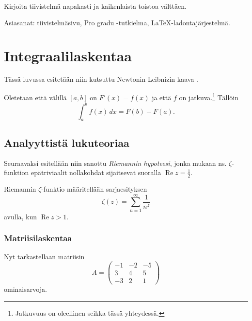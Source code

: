 \vspace{4mm}\noindent Kirjoita tiivistelmä napakasti ja kaikenlaista toistoa välttäen.

\vspace{4mm}\noindent Asiasanat: tiivistelmäsivu, Pro gradu -tutkielma, \LaTeX-ladontajärjestelmä.




\cleardoublepage

\tableofcontents

\cleardoublepage

\pagestyle{plain} 

\section{Integraalilaskentaa}

Tässä luvussa esitetään niin kutsuttu Newtonin-Leibnizin kaava \cite{NewtLeib}.

\begin{theorem} Oletetaan että välillä $[a,b]$ on $F'(x)=f(x)$ ja että $f$ on jatkuva.\footnote{Jatkuvuus on oleellinen seikka tässä yhteydessä.} Tällöin
\[
\int_a^bf(x)\,dx=F(b)-F(a).
\]
\end{theorem}

\subsection{Analyyttistä lukuteoriaa}

Seuraavaksi esitellään niin sanottu {\em Riemannin hypoteesi}, jonka mukaan ns. $\zeta$-funktion epätriviaalit nollakohdat sijaitsevat suoralla $\operatorname{Re}z=\frac12$.
\begin{definition} Riemannin $\zeta$-funktio määritellään sarjaesityksen \cite{Riemann}
\[
\zeta(z)=\sum_{n=1}^{\infty}\frac{1}{n^z}
\]
avulla, kun $\operatorname{Re}z>1$.
\end{definition}

\subsubsection{Matriisilaskentaa}

Nyt tarkastellaan matriisin
\[
A=\left(\begin{array}{rrr} -1 & -2 & -5\\ 3& 4& 5\\ -3 & 2 & 1 \end{array}\right)
\]
ominaisarvoja.

